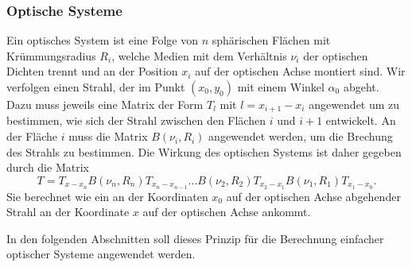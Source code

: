 \subsubsection{Optische Systeme}
Ein optisches System ist eine Folge von $n$ sphärischen Flächen mit
Krümmungsradius $R_i$, welche Medien mit dem Verhältnis $\nu_i$
der optischen Dichten trennt und an der Position $x_i$ auf der optischen
Achse montiert sind.
Wir verfolgen einen Strahl, der im Punkt $(x_0,y_0)$ mit einem Winkel
$\alpha_0$ abgeht.
Dazu muss jeweils eine Matrix der Form $T_l$ mit $l={x_{i+1}-x_{i}}$
angewendet um zu bestimmen, wie sich der Strahl zwischen den Flächen
$i$ und $i+1$ entwickelt.
An der Fläche $i$ muss die Matrix $B(\nu_i,R_i)$ angewendet werden, um
die Brechung des Strahls zu bestimmen.
Die Wirkung des optischen Systems ist daher gegeben durch die Matrix
\[
T
=
T_{x-x_n}
B(\nu_n,R_n)
T_{x_n-x_{n-1}}
\dots
B(\nu_2,R_2)
T_{x_2-x_1}
B(\nu_1,R_1)
T_{x_1-x_0}.
\]
Sie berechnet wie ein an der Koordinaten $x_0$ auf der optischen Achse
abgehender Strahl an der Koordinate $x$ auf der optischen Achse
ankommt.

In den folgenden Abschnitten soll dieses Prinzip für die Berechnung
einfacher optischer Systeme angewendet werden.



